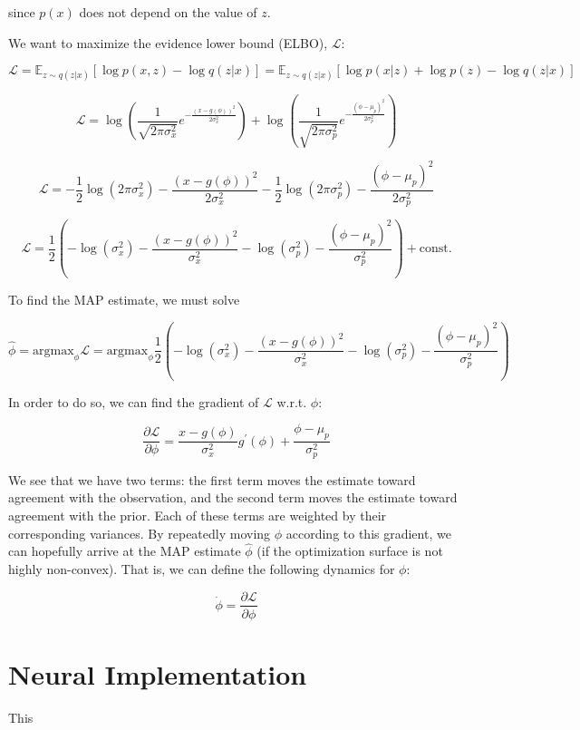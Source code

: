 \noindent since $p(x)$ does not depend on the value of $z$.

We want to maximize the evidence lower bound (ELBO), $\mathcal{L}$:

\begin{equation}
	\mathcal{L} = \mathbb{E}_{z \sim q(z|x)} \left[ \log p(x, z) - \log q(z|x) \right] = \mathbb{E}_{z \sim q(z|x)} \left[ \log p(x|z) + \log p(z) - \log q(z|x) \right] 
\end{equation}

\begin{equation}
	\mathcal{L} = \log \left( \frac{1}{\sqrt{2 \pi \sigma_x^2}} e^{-\frac{(x - g(\phi))^2}{2 \sigma_x^2}} \right) + \log \left( \frac{1}{\sqrt{2 \pi \sigma_p^2}} e^{-\frac{(\phi - \mu_p)^2}{2 \sigma_p^2}} \right)
\end{equation}

\begin{equation}
	\mathcal{L} = -\frac{1}{2} \log ( 2 \pi \sigma_x^2 )  - \frac{(x - g(\phi))^2}{2 \sigma_x^2} - \frac{1}{2} \log ( 2 \pi \sigma_p^2 ) -\frac{(\phi - \mu_p)^2}{2 \sigma_p^2}
\end{equation}

\begin{equation}
	\mathcal{L} = \frac{1}{2} \left( - \log ( \sigma_x^2 )  - \frac{(x - g(\phi))^2}{\sigma_x^2} - \log ( \sigma_p^2 ) -\frac{(\phi - \mu_p)^2}{\sigma_p^2} \right) + \text{const.}
\end{equation}

\noindent To find the MAP estimate, we must solve

\begin{equation}
	\hat{\phi} = \text{argmax}_\phi \mathcal{L} =  \text{argmax}_\phi \frac{1}{2} \left( - \log ( \sigma_x^2 )  - \frac{(x - g(\phi))^2}{\sigma_x^2} - \log ( \sigma_p^2 ) -\frac{(\phi - \mu_p)^2}{\sigma_p^2} \right)
\end{equation}

\noindent In order to do so, we can find the gradient of $\mathcal{L}$ w.r.t. $\phi$:

\begin{equation}
	\frac{\partial \mathcal{L}}{\partial \phi} = \frac{x - g(\phi)}{\sigma_x^2} g^\prime (\phi) + \frac{\phi - \mu_p}{\sigma_p^2}
\end{equation}

\noindent We see that we have two terms: the first term moves the estimate toward agreement with the observation, and the second term moves the estimate toward agreement with the prior. Each of these terms are weighted by their corresponding variances. By repeatedly moving $\phi$ according to this gradient, we can hopefully arrive at the MAP estimate $\hat{\phi}$ (if the optimization surface is not highly non-convex). That is, we can define the following dynamics for $\phi$:

\begin{equation}
	\dot{\phi} = \frac{\partial \mathcal{L}}{\partial \phi}
\end{equation}

\section{Neural Implementation}

This 


